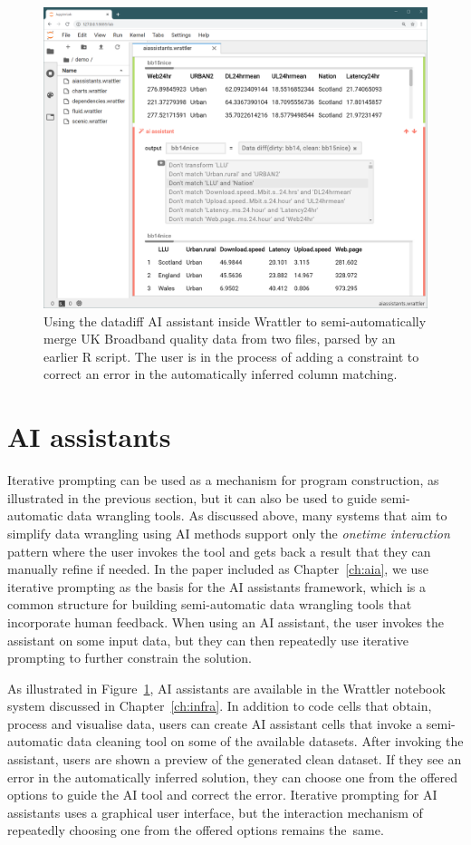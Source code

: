 \documentclass[fleqn,11pt]{report}
\theoremstyle{definition}
\begin{document}
\begin{figure}[t]
\centering
\includegraphics[scale=0.24]{img/datadiff.png}
\caption{Using the datadiff AI assistant inside Wrattler to semi-automatically merge
UK Broadband quality data from two files, parsed by an earlier R script. The user is in the process
of adding a constraint to correct an error in the automatically inferred column matching.}
\label{fig:ddiff}
\end{figure}

\section{AI assistants}
Iterative prompting can be used as a mechanism for program construction, as illustrated in the
previous section, but it can also be used to guide semi-automatic data wrangling tools.
As discussed above, many systems that aim to simplify data wrangling using AI methods support
only the \emph{onetime interaction} pattern where the user invokes the tool and gets back a
result that they can manually refine if needed. In the paper included as Chapter~\ref{ch:aia},
we use iterative prompting as the basis for the AI assistants framework, which is a common
structure for building semi-automatic data wrangling tools that incorporate human feedback.
When using an AI assistant, the user invokes the assistant on some input data, but they can then
repeatedly use iterative prompting to further constrain the solution.

As illustrated in Figure~\ref{fig:ddiff}, AI assistants are available in the
Wrattler notebook system discussed in Chapter~\ref{ch:infra}. In addition to code cells that
obtain, process and visualise data, users can create AI assistant cells that invoke a semi-automatic
data cleaning tool on some of the available datasets. After invoking the assistant, users are
shown a preview of the generated clean dataset. If they see an error in the automatically inferred
solution, they can choose one from the offered options to guide the AI tool and correct the error.
Iterative prompting for AI assistants uses a graphical user interface, but the
interaction mechanism of repeatedly choosing one from the offered options remains the~same.
\end{document}
